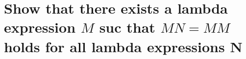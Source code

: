 \section{Show that there exists a lambda expression $M$ suc that $M N = M M$ holds for all lambda expressions N}